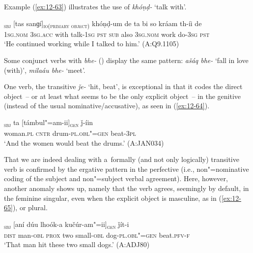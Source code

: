 Example (\ref{ex:12-63}) illustrates the use of \textit{khóṇḍ-} `talk with'.

\begin{exe}
\ex
\label{ex:12-63}
\gll [ma]\textsubscript{\textsc{sbj}} [tas sanɡí]\textsubscript{\textsc{io(primary object)}} khóṇḍ-um de ta bi so kráam th-íi de \\
\textsc{1sg.nom} \textsc{3sg.acc} with talk-\textsc{1sg} \textsc{pst}  \textsc{sub} also \textsc{3sg.nom} work do-\textsc{3sg} \textsc{pst} \\
\glt `He continued working while I talked to him.' (A:Q9.1105)
\end{exe}

Some conjunct verbs with \textit{bhe-} () display the same pattern: \textit{ašáq bhe-} `fall in love (with)', \textit{milaáu bhe-} `meet'.


 One verb, the transitive \textit{ǰe-} `hit, beat', is exceptional in that it codes the direct object~-- or at least what seems to be the only explicit object~-- in the genitive (instead of the usual nominative/accusative), as seen in (\ref{ex:12-64}).

\begin{exe}
\ex
\label{ex:12-64}
\gll [kuṛíina]\textsubscript{\textsc{sbj}} ta [támbul"=am-ii]\textsubscript{\textsc{gen}} ǰ-íin  \\
woman.\textsc{pl} \textsc{cntr} drum-\textsc{pl.obl"=gen} beat-\textsc{3pl}  \\
\glt `And the women would beat the drums.' (A:JAN034)
\end{exe}

That we are indeed dealing with a~formally (and not only logically) transitive verb is confirmed by the ergative pattern in the perfective (i.e., non"=nominative coding of the subject and non"=subject verbal agreement). Here, however, another anomaly shows up, namely that the verb agrees, seemingly by default, in the feminine singular, even when the explicit object is masculine, as in (\ref{ex:12-65}), or plural.

\begin{exe}
\ex
\label{ex:12-65}
\textsubscript{\textsc{sbj}} [aní dúu lhoók-a kučúr-am"=ii]\textsubscript{\textsc{gen}} ǰít-i \\
\textsc{dist} man-\textsc{obl} \textsc{prox} two small-\textsc{obl} dog-\textsc{pl.obl"=gen} beat.\textsc{pfv-f} \\
\glt `That man hit these two small dogs.' (A:ADJ80)
\end{exe}

